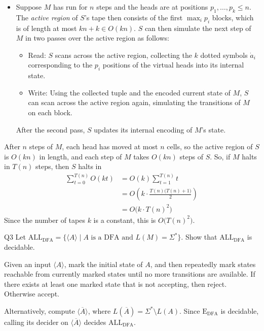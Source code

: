 \documentclass{article}
\theoremstyle{definition}
\theoremstyle{definition}
\theoremstyle{remark}
\begin{document}
\begin{itemize}
    \item Suppose $M$ has run for $n$ steps and the heads are at positions $p_1,\ldots,p_k\leq n$. The \textit{active region} of $S$'s tape then consists of the first $\max_ip_i$ blocks, which is of length at most $kn+k\in O(kn)$. $S$ can then simulate the next step of $M$ in two passes over the active region as follows:
    \begin{itemize}
        \item Read: $S$ scans across the active region, collecting the $k$ dotted symbols $\dot{a}_i$ corresponding to the $p_i$ positions of the virtual heads into its internal state.
        
        \item Write: Using the collected tuple and the encoded current state of $M$, $S$ can scan across the active region again, simulating the transitions of $M$ on each block.
    \end{itemize}
    After the second pass, $S$ updates its internal encoding of $M$'s state.
\end{itemize}

After $n$ steps of $M$, each head has moved at most $n$ cells, so the active region of $S$ is $O(kn)$ in length, and each step of $M$ takes $O(kn)$ steps of $S$. So, if $M$ halts in $T(n)$ steps, then $S$ halts in
\begin{align*}
    \sum_{t=0}^{T(n)}O(kt)&=O(k)\sum_{t=1}^{T(n)}t\\
    &=O\left(k\cdot\frac{T(n)\bigl(T(n)+1\bigr)}{2}\right)\\
    &=O\bigl(k\cdot T(n)^2\bigr)
\end{align*}
Since the number of tapes $k$ is a constant, this is $O\bigl(T(n)^2\bigr)$.





\begin{questionbox}{Q3}
    Let $\text{ALL}_\text{DFA}=\bigl\{\langle A\rangle\mid A\text{ is a DFA and }L(M)=\Sigma^\ast\bigr\}$. Show that $\text{ALL}_\text{DFA}$ is decidable.
\end{questionbox}

\bigskip

Given an input $\langle A\rangle$, mark the initial state of $A$, and then repeatedly mark states reachable from currently marked states until no more transitions are available. If there exists at least one marked state that is not accepting, then reject. Otherwise accept.

Alternatively, compute $\bigl\langle\overline{A}\bigr\rangle$, where $L(\overline{A})=\Sigma^\ast\setminus L(A)$. Since $\text{E}_\text{DFA}$ is decidable, calling its decider on $\bigl\langle\overline{A}\bigr\rangle$ decides $\text{ALL}_\text{DFA}$.
\end{document}
